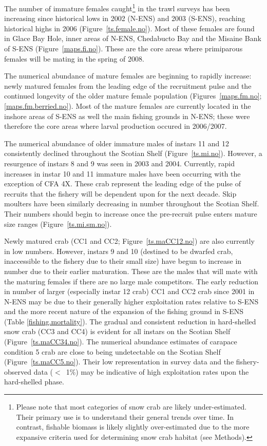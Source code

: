 \documentclass[11pt]{article}
\newcommand{\lt}{$<$}
\begin{document}
The number of immature females caught\footnote{Please note that most categories of snow crab are likely under-estimated. Their primary use is to understand their general trends over time. In contrast, fishable biomass is likely slightly over-estimated due to the more expansive criteria used for determining snow crab habitat (see Methods).} in the trawl surveys has been increasing since historical lows in 2002 (N-ENS) and 2003 (S-ENS), reaching historical highs in 2006 (Figure~\ref{ts.female.no}). Most of these females are found in Glace Bay Hole, inner areas of N-ENS, Chedabucto Bay and the Misaine Bank of S-ENS (Figure~\ref{maps.fi.no}). These are the core areas where primiparous females will be mating in the spring of 2008. 

The numerical abundance of mature females are beginning to rapidly increase: newly matured females from the leading edge of the recruitment pulse and the continued longevity of the older mature female population (Figures~\ref{maps.fm.no}; \ref{maps.fm.berried.no}). Most of the mature females are currently located in the inshore areas of S-ENS as well the main fishing grounds in N-ENS; these were therefore the core areas where larval production occured in 2006/2007.

The numerical abundance of older immature males of instars 11 and 12 consistently declined throughout the Scotian Shelf (Figure~\ref{ts.mi.no}). However, a resurgence of instars 8 and 9 was seen in 2003 and 2004. Currently, rapid increases in instar 10 and 11 immature males have been occurring with the exception of CFA 4X. These crab represent the leading edge of the pulse of recruits that the fishery will be dependent upon for the next decade. Skip moulters have been similarly decreasing in number throughout the Scotian Shelf. Their numbers should begin to increase once the pre-recruit pulse enters mature size ranges (Figure~\ref{ts.mi.sm.no}).

Newly matured crab (CC1 and CC2; Figure~\ref{ts.maCC12.no}) are also currently in low numbers. However, instars 9 and 10  (destined to be dwarfed crab, inaccessible to the fishery due to their small size) have begun to increase in number due to their earlier maturation. These are the males that will mate with the maturing females if there are no large male competitors. The early reduction in number of larger (especially instar 12 crab) CC1 and CC2 crab since 2001 in N-ENS may be due to their generally higher exploitation rates relative to S-ENS and the more recent nature of the expansion of the fishing ground in S-ENS (Table \ref{fishing.mortality}). The gradual and consistent reduction in hard-shelled snow crab (CC3 and CC4) is evident for all instars on the Scotian Shelf (Figure~\ref{ts.maCC34.no}). The numerical abundance estimates of carapace condition 5 crab are close to being undetectable on the Scotian Shelf (Figure~\ref{ts.maCC5.no}). Their low representation in survey data and the fishery-observed data (\lt~1\%) may be indicative of high exploitation rates upon the hard-shelled phase. 
\end{document}
